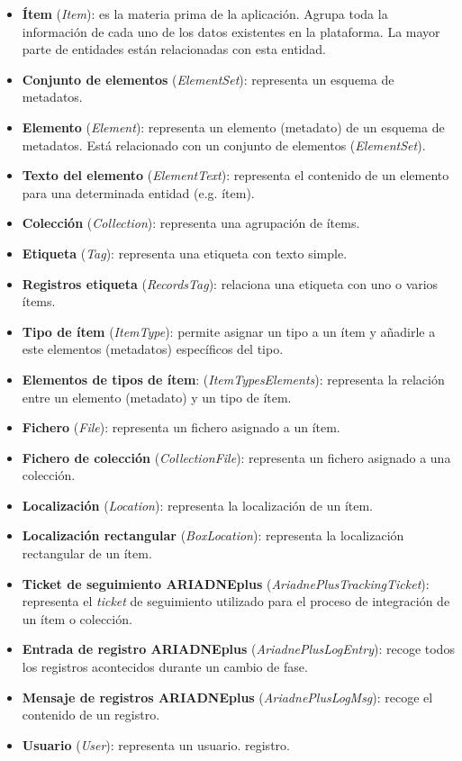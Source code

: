 \begin{itemize}
\tightlist
\item
  \textbf{Ítem} (\emph{Item}): es la materia prima de la aplicación.
  Agrupa toda la información de cada uno de los datos existentes en la
  plataforma. La mayor parte de entidades están relacionadas con esta
  entidad.
\item
  \textbf{Conjunto de elementos} (\emph{ElementSet}): representa un
  esquema de metadatos.
\item
  \textbf{Elemento} (\emph{Element}): representa un elemento (metadato)
  de un esquema de metadatos. Está relacionado con un conjunto de
  elementos (\emph{ElementSet}).
\item
  \textbf{Texto del elemento} (\emph{ElementText}): representa el
  contenido de un elemento para una determinada entidad (e.g. ítem).
\item
  \textbf{Colección} (\emph{Collection}): representa una agrupación de
  ítems.
\item
  \textbf{Etiqueta} (\emph{Tag}): representa una etiqueta con texto
  simple.
\item
  \textbf{Registros etiqueta} (\emph{RecordsTag}): relaciona una
  etiqueta con uno o varios ítems.
\item
  \textbf{Tipo de ítem} (\emph{ItemType}): permite asignar un tipo a un
  ítem y añadirle a este elementos (metadatos) específicos del tipo.
\item
  \textbf{Elementos de tipos de ítem}: (\emph{ItemTypesElements}):
  representa la relación entre un elemento (metadato) y un tipo de ítem.
\item
  \textbf{Fichero} (\emph{File}): representa un fichero asignado a un
  ítem.
\item
  \textbf{Fichero de colección} (\emph{CollectionFile}): representa un
  fichero asignado a una colección.
\item
  \textbf{Localización} (\emph{Location}): representa la localización de
  un ítem.
\item
  \textbf{Localización rectangular} (\emph{BoxLocation}): representa la
  localización rectangular de un ítem.
\item
  \textbf{Ticket de seguimiento ARIADNEplus} (\emph{AriadnePlusTrackingTicket}): representa
  el \emph{ticket} de seguimiento utilizado para el proceso de integración de un ítem o colección.
\item
  \textbf{Entrada de registro ARIADNEplus} (\emph{AriadnePlusLogEntry}): recoge todos los registros
  acontecidos durante un cambio de fase.
\item
  \textbf{Mensaje de registros ARIADNEplus} (\emph{AriadnePlusLogMsg}): recoge el contenido de un
  registro.
\item
  \textbf{Usuario} (\emph{User}): representa un usuario.
  registro.
\end{itemize}

